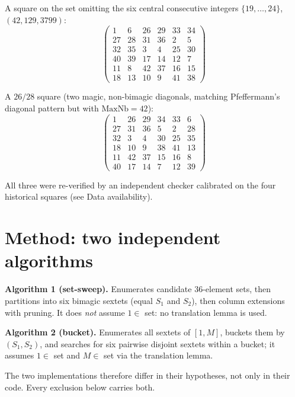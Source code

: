 \documentclass[11pt]{article}
\begin{document}
A square on the set omitting the six central consecutive integers
$\{19,\dots,24\}$, $(42,129,3799)$:
\[
\begin{pmatrix}
 1 &  6 & 26 & 29 & 33 & 34\\
27 & 28 & 31 & 36 &  2 &  5\\
32 & 35 &  3 &  4 & 25 & 30\\
40 & 39 & 17 & 14 & 12 &  7\\
11 &  8 & 42 & 37 & 16 & 15\\
18 & 13 & 10 &  9 & 41 & 38
\end{pmatrix}
\]

A $26/28$ square (two magic, non-bimagic diagonals, matching
Pfeffermann's diagonal pattern but with $\mathrm{MaxNb}=42$):
\[
\begin{pmatrix}
 1 & 26 & 29 & 34 & 33 &  6\\
27 & 31 & 36 &  5 &  2 & 28\\
32 &  3 &  4 & 30 & 25 & 35\\
18 & 10 &  9 & 38 & 41 & 13\\
11 & 42 & 37 & 15 & 16 &  8\\
40 & 17 & 14 &  7 & 12 & 39
\end{pmatrix}
\]

All three were re-verified by an independent checker calibrated on the
four historical squares (see Data availability).

\section{Method: two independent algorithms}\label{sec:method}

\textbf{Algorithm 1 (set-sweep).} Enumerates candidate $36$-element
sets, then partitions into six bimagic sextets (equal $S_1$ and $S_2$),
then column extensions with pruning. It does \emph{not} assume
$1\in$ set: no translation lemma is used.

\textbf{Algorithm 2 (bucket).} Enumerates all sextets of $[1,M]$,
buckets them by $(S_1,S_2)$, and searches for six pairwise disjoint
sextets within a bucket; it assumes $1\in$ set and $M\in$ set via the
translation lemma.

The two implementations therefore differ in their hypotheses, not only
in their code. Every exclusion below carries both.
\end{document}
